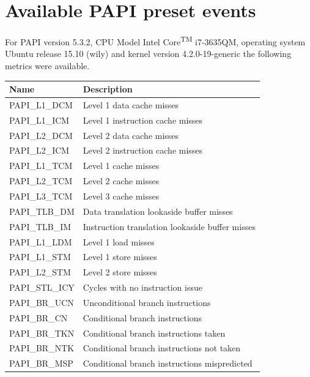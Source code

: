 \documentclass{sigplanconf}
\begin{document}
\section{Available PAPI preset events}
For PAPI version 5.3.2, CPU Model Intel\textsuperscript{\textregistered} Core\textsuperscript{TM} i7-3635QM, operating system Ubuntu release 15.10 (wily) and kernel version 4.2.0-19-generic the following metrics were available.  
\label{appendix:papi_avail}
\begin{table}[H]
\centering
  \begin{tabular}{ | L{2.2cm} | R{6cm} |  }
      \hline
Name& Description \\
    \hline
PAPI\_L1\_DCM &  Level 1 data cache misses     \\                     
PAPI\_L1\_ICM &  Level 1 instruction cache misses   \\                       
PAPI\_L2\_DCM & Level 2 data cache misses     \\                      
PAPI\_L2\_ICM &  Level 2 instruction cache misses  \\                        
PAPI\_L1\_TCM & Level 1 cache misses   \\                         
PAPI\_L2\_TCM &  Level 2 cache misses       \\                    
PAPI\_L3\_TCM &  Level 3 cache misses    \\                     
PAPI\_TLB\_DM & Data translation lookaside buffer misses \\      
PAPI\_TLB\_IM &  Instruction translation lookaside buffer misses \\
PAPI\_L1\_LDM &  Level 1 load misses   \\                        
PAPI\_L1\_STM &  Level 1 store misses    \\                       
PAPI\_L2\_STM &  Level 2 store misses   \\                        
PAPI\_STL\_ICY & Cycles with no instruction issue  \\           
PAPI\_BR\_UCN & Unconditional branch instructions   \\          
PAPI\_BR\_CN  &  Conditional branch instructions   \\           
PAPI\_BR\_TKN & Conditional branch instructions taken     \\                       
PAPI\_BR\_NTK &  Conditional branch instructions not taken   \\                       
PAPI\_BR\_MSP &  Conditional branch instructions mispredicted  \\                         

\end{tabular}
\end{table}
\end{document}
